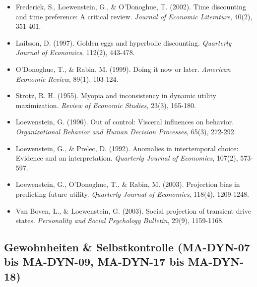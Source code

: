 \begin{itemize}[leftmargin=*]
    \item Frederick, S., Loewenstein, G., \& O'Donoghue, T. (2002). Time discounting and time preference: A critical review. \textit{Journal of Economic Literature}, 40(2), 351-401.
    \item Laibson, D. (1997). Golden eggs and hyperbolic discounting. \textit{Quarterly Journal of Economics}, 112(2), 443-478.
    \item O'Donoghue, T., \& Rabin, M. (1999). Doing it now or later. \textit{American Economic Review}, 89(1), 103-124.
    \item Strotz, R. H. (1955). Myopia and inconsistency in dynamic utility maximization. \textit{Review of Economic Studies}, 23(3), 165-180.
    \item Loewenstein, G. (1996). Out of control: Visceral influences on behavior. \textit{Organizational Behavior and Human Decision Processes}, 65(3), 272-292.
    \item Loewenstein, G., \& Prelec, D. (1992). Anomalies in intertemporal choice: Evidence and an interpretation. \textit{Quarterly Journal of Economics}, 107(2), 573-597.
    \item Loewenstein, G., O'Donoghue, T., \& Rabin, M. (2003). Projection bias in predicting future utility. \textit{Quarterly Journal of Economics}, 118(4), 1209-1248.
    \item Van Boven, L., \& Loewenstein, G. (2003). Social projection of transient drive states. \textit{Personality and Social Psychology Bulletin}, 29(9), 1159-1168.
\end{itemize}

\subsection*{Gewohnheiten \& Selbstkontrolle (MA-DYN-07 bis MA-DYN-09, MA-DYN-17 bis MA-DYN-18)}

